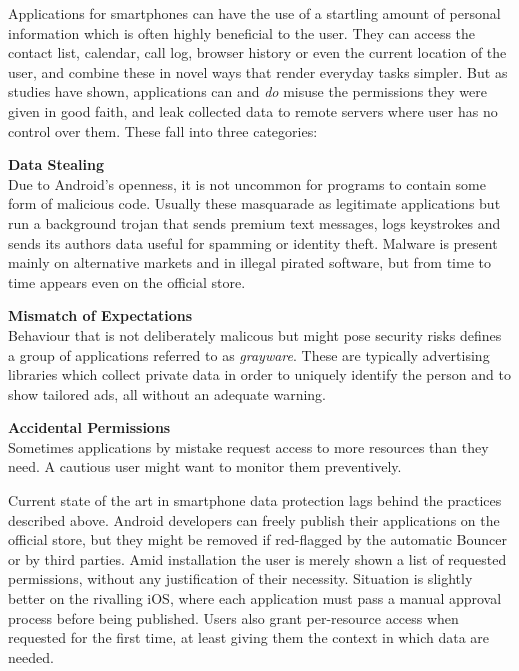 \documentclass[12pt,twoside,notitlepage]{report}
\begin{document}
Applications for smartphones can have the use of a startling amount of personal information which is often highly beneficial to the user. They can access the contact list, calendar, call log, browser history or even the current location of the user, and combine these in novel ways that render everyday tasks simpler. But as studies have shown\cite{web:Appthority, web:HuffingtonOneInThree}, applications can and \emph{do} misuse the permissions they were given in good faith, and leak collected data to remote servers where user has no control over them. These fall into three categories:
\begin{description}
\item \textbf{Data Stealing} \\
Due to Android's openness, it is not uncommon for programs to contain some form of malicious code. Usually these masquarade as legitimate applications but run a background trojan that sends premium text messages, logs keystrokes and sends its authors data useful for spamming or identity theft. Malware is present mainly on alternative markets and in illegal pirated software\cite{Zhou:2012:DRS:2133601.2133640}, but from time to time appears even on the official store\cite{web:LookoutPlayRemoval}.

\item \textbf{Mismatch of Expectations} \\
Behaviour that is not deliberately malicous but might pose security risks defines a group of applications referred to as \emph{grayware}. These are typically advertising libraries which collect private data in order to uniquely identify the person and to show tailored ads, all without an adequate warning.

\item \textbf{Accidental Permissions} \\
Sometimes applications by mistake request access to more resources than they need. A cautious user might want to monitor them preventively. 
\end{description}

Current state of the art in smartphone data protection lags behind the practices described above. Android developers can freely publish their applications on the official store, but they might be removed if red-flagged by the automatic Bouncer\cite{web:Bouncer} or by third parties\cite{web:LookoutPlayRemoval}. Amid installation the user is merely shown a list of requested permissions, without any justification of their necessity. Situation is slightly better on the rivalling iOS, where each application must pass a manual approval process before being published. Users also grant per-resource access when requested for the first time, at least giving them the context in which data are needed.
\end{document}
